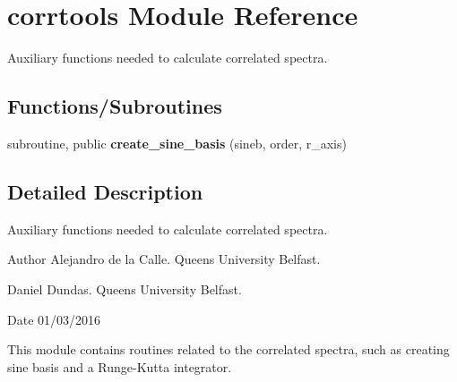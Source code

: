 \hypertarget{namespacecorrtools}{}\section{corrtools Module Reference}
\label{namespacecorrtools}


Auxiliary functions needed to calculate correlated spectra.  


\subsection*{Functions/\+Subroutines}
\begin{DoxyCompactItemize}
\item 
\mbox{\label{namespacecorrtools_a9dffe12a4315b0249103557d5f38051e}} 
subroutine, public {\bfseries create\+\_\+sine\+\_\+basis} (sineb, order, r\+\_\+axis)
\end{DoxyCompactItemize}


\subsection{Detailed Description}
Auxiliary functions needed to calculate correlated spectra. 

\begin{DoxyAuthor}{Author}
Alejandro de la Calle. Queen\textquotesingle{}s University Belfast. 

Daniel Dundas. Queen\textquotesingle{}s University Belfast. 
\end{DoxyAuthor}
\begin{DoxyDate}{Date}
01/03/2016
\end{DoxyDate}
This module contains routines related to the correlated spectra, such as creating sine basis and a Runge-\/\+Kutta integrator. 